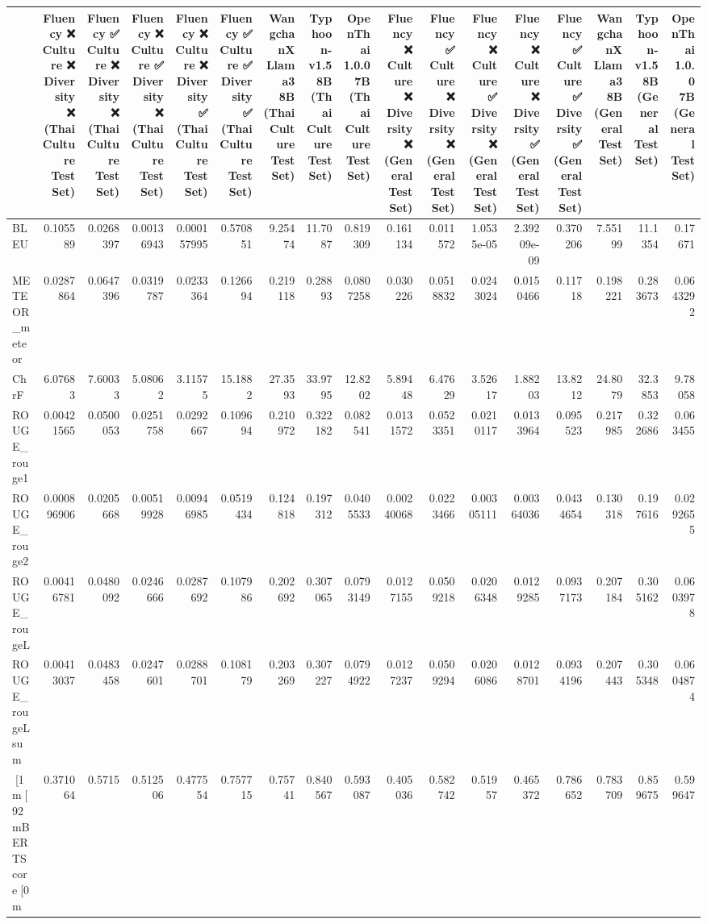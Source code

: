 \begin{tabular}{lrrrrrrrrrrrrrrrr}
\hline
                 &             Fluency ❌
 Culture ❌
 Diversity ❌
(Thai Culture Test Set) &           Fluency ✅
 Culture ❌
 Diversity ❌
(Thai Culture Test Set) &            Fluency ❌
 Culture ✅
 Diversity ❌
(Thai Culture Test Set) &             Fluency ❌
 Culture ❌
 Diversity ✅
(Thai Culture Test Set) &            Fluency ✅
 Culture ✅
 Diversity ✅
(Thai Culture Test Set) &           WangchanX Llama3 8B
(Thai Culture Test Set) &           Typhoon-v1.5 8B
(Thai Culture Test Set) &            OpenThai 1.0.0 7B
(Thai Culture Test Set) &            Fluency ❌
 Culture ❌
 Diversity ❌
(General Test Set) &           Fluency ✅
 Culture ❌
 Diversity ❌
(General Test Set) &            Fluency ❌
 Culture ✅
 Diversity ❌
(General Test Set) &             Fluency ❌
 Culture ❌
 Diversity ✅
(General Test Set) &            Fluency ✅
 Culture ✅
 Diversity ✅
(General Test Set) &           WangchanX Llama3 8B
(General Test Set) &           Typhoon-v1.5 8B
(General Test Set) &           OpenThai 1.0.0 7B
(General Test Set) \\
\hline
 BLEU            & 0.105589    & 0.0268397 & 0.00136943 & 0.000157995 &  0.570851  &  9.25474  & 11.7087   &  0.819309  & 0.161134   & 0.011572  & 1.0535e-05 & 2.39209e-09 &  0.370206  &  7.55199  & 11.1354   & 0.17671   \\
 METEOR_meteor   & 0.0287864   & 0.0647396 & 0.0319787  & 0.0233364   &  0.126694  &  0.219118 &  0.28893  &  0.0807258 & 0.030226   & 0.0518832 & 0.0243024  & 0.0150466   &  0.11718   &  0.198221 &  0.283673 & 0.0643292 \\
 ChrF            & 6.07683     & 7.60033   & 5.08062    & 3.11575     & 15.1882    & 27.3593   & 33.9795   & 12.8202    & 5.89448    & 6.47629   & 3.52617    & 1.88203     & 13.8212    & 24.8079   & 32.3853   & 9.78058   \\
 ROUGE_rouge1    & 0.00421565  & 0.0500053 & 0.0251758  & 0.0292667   &  0.109694  &  0.210972 &  0.322182 &  0.082541  & 0.0131572  & 0.0523351 & 0.0210117  & 0.0133964   &  0.095523  &  0.217985 &  0.322686 & 0.063455  \\
 ROUGE_rouge2    & 0.000896906 & 0.0205668 & 0.00519928 & 0.00946985  &  0.0519434 &  0.124818 &  0.197312 &  0.0405533 & 0.00240068 & 0.0223466 & 0.00305111 & 0.00364036  &  0.0434654 &  0.130318 &  0.197616 & 0.0292655 \\
 ROUGE_rougeL    & 0.00416781  & 0.0480092 & 0.0246666  & 0.0287692   &  0.107986  &  0.202692 &  0.307065 &  0.0793149 & 0.0127155  & 0.0509218 & 0.0206348  & 0.0129285   &  0.0937173 &  0.207184 &  0.305162 & 0.0603978 \\
 ROUGE_rougeLsum & 0.00413037  & 0.0483458 & 0.0247601  & 0.0288701   &  0.108179  &  0.203269 &  0.307227 &  0.0794922 & 0.0127237  & 0.0509294 & 0.0206086  & 0.0128701   &  0.0934196 &  0.207443 &  0.305348 & 0.0604874 \\
 [1m[92mBERTScore[0m       & 0.371064    & 0.5715    & 0.512506   & 0.477554    &  0.757715  &  0.75741  &  0.840567 &  0.593087  & 0.405036   & 0.582742  & 0.51957    & 0.465372    &  0.786652  &  0.783709 &  0.859675 & 0.599647  \\
\hline
\end{tabular}